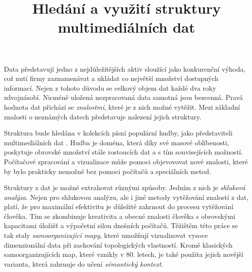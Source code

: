 \documentclass[thesis=M,czech]{FITthesis}[2012/06/26]
\title{Hledání a využití struktury multimediálních dat}
\begin{document}
\renewcommand\listingscaption{Ukázka}

\begin{introduction}

\begin{quote}
\end{quote}

Data představují jedno z nejdůležitějších aktiv sloužící jako konkurenční výhoda, což nutí firmy zaznamenávat a ukládat co největší množství dostupných informací\cite{most_val_asset}. Nejen z tohoto důvodu se celkový objem dat každé dva roky zdvojnásobí\cite{double}. Nicméně uložená nezpracovaná data samotná jsou bezcenná. Pravá hodnota dat přichází se \textit{znalostmi}, které je z nich možné vytěžit. Mezi základní znalosti o neznámých datech představuje nalezení jejich struktury.

\begin{quote}
    \cite{struktura}
\end{quote}

Struktura bude hledána v kolekcích písní populární hudby, jako představiteli multimediálních dat \cite{multimedia}. Hudba je doména, která díky své masové oblíbenosti, poskytuje obrovské množství stále rostoucích dat a s tím souvisejících možností. Počítačové zpracování a vizualizace může pomoci objevovovat nové znalosti, které by bylo prakticky nemožné bez pomoci počítačů a speciálních metod.









Struktury z dat je možné extrahovat různými způsoby. Jedním z nich je \textit{shluková analýza}. Nejen pro shlukovou analýzu, ale i jiné metody vytěžování znalostí z dat, platí, že pro maximální efektivitu je důležité zahrnout do procesu vytěžování člověka. Tím se zkombinuje kreativita a obecné znalosti člověka s obrovskými kapacitami úložišť a výpočetní silou dnešních počítačů.
Těžištěm této práce se tak staly \textit{samoorganizující mapy}, které umožňují vizualizovat vysoce dimenzionální data při zachování topologických vlastností. Kromě klasických samoorganizujících map, které vznikly v 80. letech, je také použita jejich novější varianta, která zahrnuje do učení \textit{sémantický kontext}.



\end{introduction}
\end{document}

